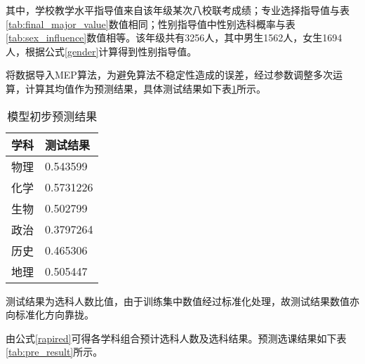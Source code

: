 \documentclass[bwprint]{cumcmthesis}
\begin{document}
其中，学校教学水平指导值来自该年级某次八校联考成绩；专业选择指导值与表\ref{tab:final_major_value}数值相同；性别指导值中性别选科概率与表\ref{tab:sex_influence}数值相等。该年级共有3256人，其中男生1562人，女生1694人，根据公式\ref{gender}计算得到性别指导值。

将数据导入MEP算法\cite{oltean2002multi}，为避免算法不稳定性造成的误差，经过参数调整多次运算，计算其均值作为预测结果，具体测试结果如下表\ref{tab:test_result}所示。

	\begin{longtable}{p{3cm}p{3cm}}
		\caption{\label{tab:test_result}模型初步预测结果}\\
		\toprule
		学科    & \multicolumn{1}{l}{测试结果} \\
		\midrule
		物理    & 0.543599 \\
		化学    & 0.5731226 \\
		生物    & 0.502799 \\
		政治    & 0.3797264 \\
		历史    & 0.465306 \\
		地理    & 0.505447 \\
		\bottomrule
	\end{longtable}%

测试结果为选科人数比值，由于训练集中数值经过标准化处理，故测试结果数值亦向标准化方向靠拢。

由公式\ref{rapired}可得各学科组合预计选科人数及选科结果。预测选课结果如下表\ref{tab:pre_result}所示。

\end{document}

